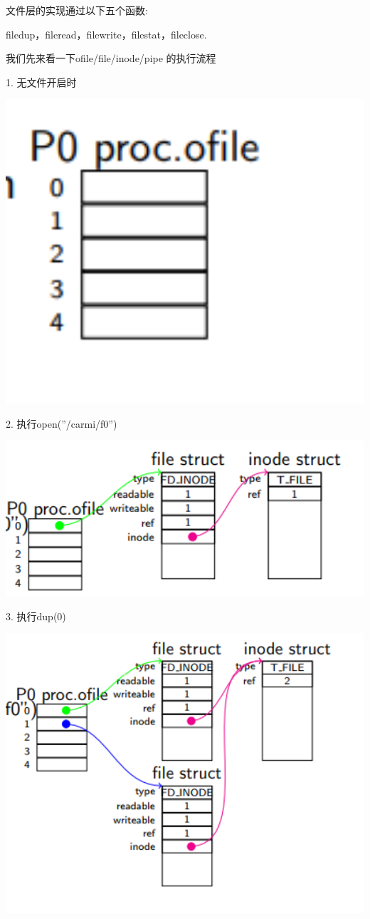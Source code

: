 文件层的实现通过以下五个函数:

filedup，fileread，filewrite，filestat，fileclose.

我们先来看一下ofile/file/inode/pipe 的执行流程

1. 无文件开启时

\includegraphics[width=6in]{figures/eg_file/image156.png}

2. 执行open(”/carmi/f0”)

\includegraphics[width=6in]{figures/eg_file/image157.png}

3. 执行dup(0)

\includegraphics[width=6in]{figures/eg_file/image158.png}

